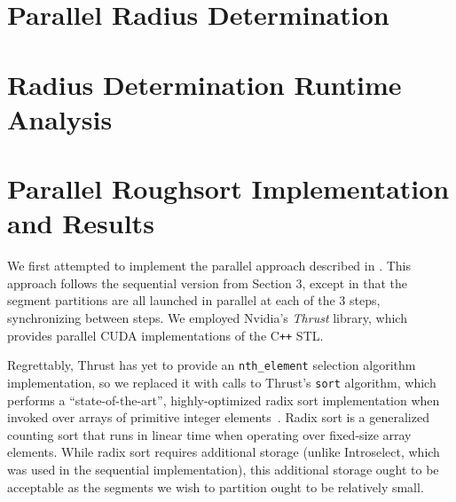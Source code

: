 \documentclass[letterpaper, 12pt]{article}
\let\supercite\cite
\renewcommand{\cite}[1]{\textnormal{~\supercite{#1}}}
\begin{document}
\section{Parallel Radius Determination}

\section{Radius Determination Runtime Analysis}

\begin{sidewaysfigure}

\vspace{-4ex}
\caption{\label{fig:seqpar2}{\em
  Radius Determination Runtimes over Arrays of Length $n\cdot 10^6$, $k = 2$
}}
\end{sidewaysfigure}

\begin{sidewaysfigure}

\vspace{-4ex}
\caption{\label{fig:seqpar100}{\em
  Radius Determination Runtimes over Arrays of Length $n\cdot 10^6$, $k = 100$
}}
\end{sidewaysfigure}

\clearpage
\section{Parallel Roughsort Implementation and Results}

We first attempted to implement the parallel approach described in \supercite{altman89}.
This approach follows the sequential version from Section 3, except in that the segment partitions are all launched in parallel
  at each of the 3 steps, synchronizing between steps.
We employed Nvidia's \textit{Thrust} library, which provides parallel CUDA implementations of the C\texttt{++} STL.

Regrettably, Thrust has yet to provide an \texttt{nth_element} selection algorithm implementation, so we replaced it with calls
  to Thrust's \texttt{sort} algorithm, which performs a ``state-of-the-art'', highly-optimized radix sort
  implementation when invoked over arrays of primitive integer elements\cite{thrustradix, leischner09}.
Radix sort is a generalized counting sort that runs in linear time when operating over fixed-size array elements.
While radix sort requires additional storage (unlike Introselect, which was used in the sequential implementation), this
  additional storage ought to be acceptable as the segments we wish to partition ought to be relatively small.
\end{document}
